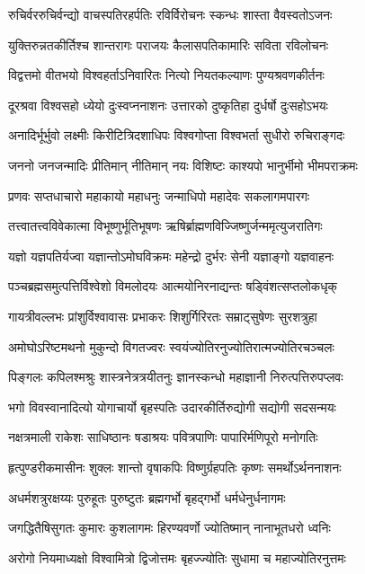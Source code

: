 \twolineshloka
{रुचिर्वररुचिर्वन्द्यो वाचस्पतिरहर्पतिः}
{रविर्विरोचनः स्कन्धः शास्ता वैवस्वतोऽजनः}

\twolineshloka
{युक्तिरुन्नतकीर्तिश्च शान्तरागः पराजयः}
{कैलासपतिकामारिः सविता रविलोचनः}

\twolineshloka
{विद्वत्तमो वीतभयो विश्वहर्ताऽनिवारितः}
{नित्यो नियतकल्याणः पुण्यश्रवणकीर्तनः}

\twolineshloka
{दूरश्रवा विश्वसहो ध्येयो दुःस्वप्ननाशनः}
{उत्तारको दुष्कृतिहा दुर्धर्षो दुःसहोऽभयः}

\twolineshloka
{अनादिर्भूर्भुवो लक्ष्मीः किरीटित्रिदशाधिपः}
{विश्वगोप्ता विश्वभर्ता सुधीरो रुचिराङ्गदः}

\twolineshloka
{जननो जनजन्मादिः प्रीतिमान् नीतिमान् नयः}
{विशिष्टः काश्यपो भानुर्भीमो भीमपराक्रमः}

\twolineshloka
{प्रणवः सप्तधाचारो महाकायो महाधनुः}
{जन्माधिपो महादेवः सकलागमपारगः}

\twolineshloka
{तत्त्वातत्त्वविवेकात्मा विभूष्णुर्भूतिभूषणः}
{ऋषिर्ब्राह्मणविज्जिष्णुर्जन्ममृत्युजरातिगः}

\twolineshloka
{यज्ञो यज्ञपतिर्यज्वा यज्ञान्तोऽमोघविक्रमः}
{महेन्द्रो दुर्भरः सेनी यज्ञाङ्गो यज्ञवाहनः}

\twolineshloka
{पञ्चब्रह्मसमुत्पत्तिर्विश्वेशो विमलोदयः}
{आत्मयोनिरनाद्यन्तः षड्विंशत्सप्तलोकधृक्}

\twolineshloka
{गायत्रीवल्लभः प्रांशुर्विश्वावासः प्रभाकरः}
{शिशुर्गिरिरतः सम्राट्सुषेणः सुरशत्रुहा}

\twolineshloka
{अमोघोऽरिष्टमथनो मुकुन्दो विगतज्वरः}
{स्वयंज्योतिरनुज्योतिरात्मज्योतिरचञ्चलः}

\twolineshloka
{पिङ्गलः कपिलश्मश्रुः शास्त्रनेत्रत्रयीतनुः}
{ज्ञानस्कन्धो महाज्ञानी निरुत्पत्तिरुपप्लवः}

\twolineshloka
{भगो विवस्वानादित्यो योगाचार्यो बृहस्पतिः}
{उदारकीर्तिरुद्योगी सद्योगी सदसन्मयः}

\twolineshloka
{नक्षत्रमाली राकेशः साधिष्ठानः षडाश्रयः}
{पवित्रपाणिः पापारिर्मणिपूरो मनोगतिः}

\twolineshloka
{हृत्पुण्डरीकमासीनः शुक्लः शान्तो वृषाकपिः}
{विष्णुर्ग्रहपतिः कृष्णः समर्थोऽर्थननाशनः}

\twolineshloka
{अधर्मशत्रुरक्षय्यः पुरुहूतः पुरुष्टुतः}
{ब्रह्मगर्भो बृहद्गर्भो धर्मधेनुर्धनागमः}

\twolineshloka
{जगद्धितैषिसुगतः कुमारः कुशलागमः}
{हिरण्यवर्णो ज्योतिष्मान् नानाभूतधरो ध्वनिः}

\twolineshloka
{अरोगो नियमाध्यक्षो विश्वामित्रो द्विजोत्तमः}
{बृहज्ज्योतिः सुधामा च महाज्योतिरनुत्तमः}

